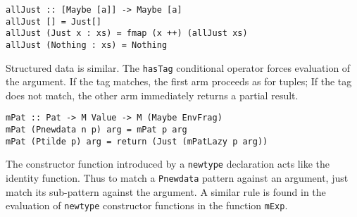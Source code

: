 \documentclass{entcs} \usepackage{entcsmacro}
\begin{document}
{\small
\begin{verbatim}  
allJust :: [Maybe [a]] -> Maybe [a]  
allJust [] = Just[]
allJust (Just x : xs) = fmap (x ++) (allJust xs)
allJust (Nothing : xs) = Nothing  
\end{verbatim}
}

Structured data is similar. The {\tt hasTag} conditional operator forces
evaluation of the argument. If the tag matches, the first arm proceeds as for
tuples; If the tag does not match, the other arm immediately returns a partial
result.


{\small
\begin{verbatim}
mPat :: Pat -> M Value -> M (Maybe EnvFrag)
mPat (Pnewdata n p) arg = mPat p arg
mPat (Ptilde p) arg = return (Just (mPatLazy p arg))
\end{verbatim}
}

The constructor function introduced by a {\tt newtype} declaration acts like the
identity function. Thus to match a {\tt Pnewdata} pattern against an argument,
just match its sub-pattern against the argument. A similar rule is found in the
evaluation of {\tt newtype} constructor functions in the function {\tt mExp}.
\end{document}
